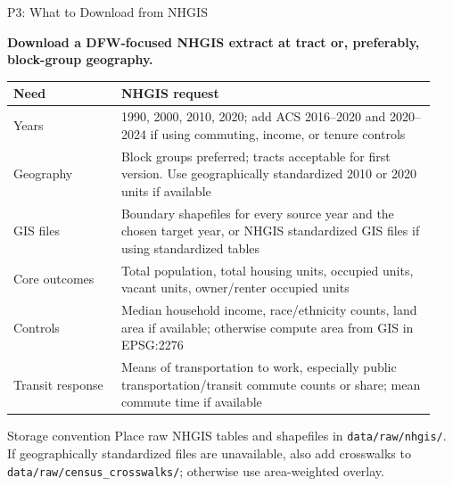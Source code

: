 \documentclass[10pt]{beamer}
\begin{document}
\begin{frame}[shrink=7]{P3: What to Download from NHGIS}

\small
\textbf{Download a DFW-focused NHGIS extract at tract or, preferably, block-group
geography.}

\medskip
\renewcommand{\arraystretch}{1.22}
\begin{tabular}{@{}p{0.24\linewidth}p{0.70\linewidth}@{}}
\toprule
Need & NHGIS request \\
\midrule
Years & 1990, 2000, 2010, 2020; add ACS 2016--2020 and 2020--2024 if using
commuting, income, or tenure controls \\[3pt]
Geography & Block groups preferred; tracts acceptable for first version.
Use geographically standardized 2010 or 2020 units if available \\[3pt]
GIS files & Boundary shapefiles for every source year and the chosen target
year, or NHGIS standardized GIS files if using standardized tables \\[3pt]
Core outcomes & Total population, total housing units, occupied units,
vacant units, owner/renter occupied units \\[3pt]
Controls & Median household income, race/ethnicity counts, land area if
available; otherwise compute area from GIS in EPSG:2276 \\[3pt]
Transit response & Means of transportation to work, especially public
transportation/transit commute counts or share; mean commute time if available \\
\bottomrule
\end{tabular}

\vspace{0.2cm}
\begin{block}{Storage convention}
\small
Place raw NHGIS tables and shapefiles in \texttt{data/raw/nhgis/}. If
geographically standardized files are unavailable, also add crosswalks to
\texttt{data/raw/census\_crosswalks/}; otherwise use area-weighted overlay.
\end{block}

\end{frame}
\end{document}
